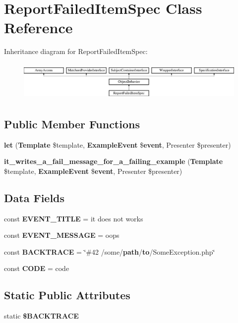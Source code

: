 \section{Report\+Failed\+Item\+Spec Class Reference}
\label{classspec_1_1_php_spec_1_1_formatter_1_1_html_1_1_report_failed_item_spec}
Inheritance diagram for Report\+Failed\+Item\+Spec\+:\begin{figure}[H]
\begin{center}
\leavevmode
\includegraphics[height=1.953488cm]{classspec_1_1_php_spec_1_1_formatter_1_1_html_1_1_report_failed_item_spec}
\end{center}
\end{figure}
\subsection*{Public Member Functions}
\begin{DoxyCompactItemize}
\item 
{\bf let} ({\bf Template} \$template, {\bf Example\+Event} \${\bf event}, Presenter \$presenter)
\item 
{\bf it\+\_\+writes\+\_\+a\+\_\+fail\+\_\+message\+\_\+for\+\_\+a\+\_\+failing\+\_\+example} ({\bf Template} \$template, {\bf Example\+Event} \${\bf event}, Presenter \$presenter)
\end{DoxyCompactItemize}
\subsection*{Data Fields}
\begin{DoxyCompactItemize}
\item 
const {\bf E\+V\+E\+N\+T\+\_\+\+T\+I\+T\+L\+E} = \textquotesingle{}it does not works\textquotesingle{}
\item 
const {\bf E\+V\+E\+N\+T\+\_\+\+M\+E\+S\+S\+A\+G\+E} = \textquotesingle{}oops\textquotesingle{}
\item 
const {\bf B\+A\+C\+K\+T\+R\+A\+C\+E} = \char`\"{}\#42 /some/{\bf path}/{\bf to}/Some\+Exception.\+php\char`\"{}
\item 
const {\bf C\+O\+D\+E} = \textquotesingle{}code\textquotesingle{}
\end{DoxyCompactItemize}
\subsection*{Static Public Attributes}
\begin{DoxyCompactItemize}
\item 
static {\bf \$\+B\+A\+C\+K\+T\+R\+A\+C\+E}
\end{DoxyCompactItemize}
